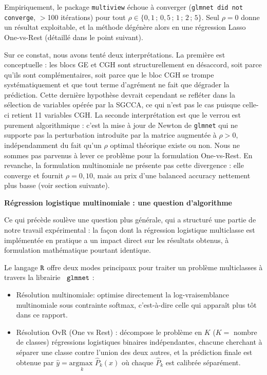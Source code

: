 \documentclass[a4paper,11pt]{paper}
\theoremstyle{plain}
\theoremstyle{definition}
\theoremstyle{remark}
\begin{document}
Empiriquement, le package \texttt{multiview} échoue à converger (\texttt{glmnet did not converge}, $>$100 itérations) pour tout $\rho \in \{0{,}1\,;\,0{,}5\,;\,1\,;\,2\,;\,5\}$. Seul $\rho = 0$ donne un résultat exploitable, et la méthode dégénère alors en une régression Lasso One-vs-Rest (détaillé dans le point suivant).

\bigskip

Sur ce constat, nous avons tenté deux interprétations. La première est conceptuelle : les blocs GE et CGH sont structurellement en désaccord, soit parce qu'ils sont complémentaires, soit parce que le bloc CGH se trompe systématiquement et que tout terme d'agrément ne fait que dégrader la prédiction. Cette dernière hypothèse devrait cependant se refléter dans la sélection de variables opérée par la SGCCA, ce qui n'est pas le cas puisque celle-ci retient 11 variables CGH. La seconde interprétation est que le verrou est purement algorithmique : c'est la mise à jour de Newton de \verb|glmnet| qui ne supporte pas la perturbation introduite par la matrice augmentée à $\rho > 0$, indépendamment du fait qu'un $\rho$ optimal théorique existe ou non. Nous ne sommes pas parvenus à lever ce problème pour la formulation One-vs-Rest. En revanche, la formulation multinomiale ne présente pas cette divergence : elle converge et fournit $\rho = 0{,}10$, mais au prix d'une balanced accuracy nettement plus basse (voir section suivante).


\bigskip

\begin{center}
    \Large \textbf{Régression logistique multinomiale : une question d'algorithme}
\end{center}

Ce qui précède soulève une question plus générale, qui a structuré une partie de notre travail expérimental : la façon dont la régression logistique multiclasse est implémentée en pratique a un impact direct sur les résultats obtenus, à formulation mathématique pourtant identique.

Le langage $\verb|R|$ offre deux modes principaux pour traiter un problème multiclasses à travers la librairie $\verb| glmnet|$ :
\begin{itemize}
    \item Résolution multinomiale: optimise directement la log-vraisemblance multinomiale sous contrainte softmax, c'est-à-dire celle qui apparaît plus tôt dans ce rapport.
    \item Résolution OvR (One vs Rest) : décompose le problème en $K$ ($K =$ nombre de classes) régressions logistiques binaires indépendantes, chacune cherchant à séparer une classe contre l'union des deux autres, et la prédiction finale est obtenue par $\hat y = \displaystyle \underset{k}{\text{argmax }} \hat P_k(x)$ où chaque $\hat P_k$ est calibrée séparément.
\end{itemize}
\end{document}
